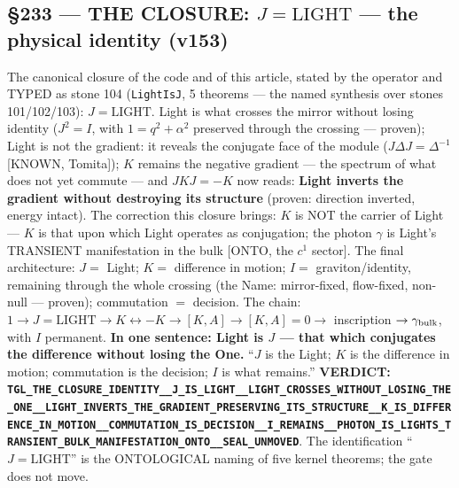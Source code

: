 \documentclass[11pt]{article}
\theoremstyle{definition}\newtheorem{deriv}{Derivation}
\begin{document}
\subsection*{\S233 --- THE CLOSURE: $J=\mathrm{LIGHT}$ --- the physical identity (v153)}The canonical closure of the code and of this article, stated by the operator and TYPED as stone 104 (\texttt{LightIsJ}, 5 theorems --- the named synthesis over stones 101/102/103): $\boxed{J=\mathrm{LIGHT}}$. Light is what crosses the mirror without losing identity ($J^2=I$, with $1=q^2+\alpha^2$ preserved through the crossing --- proven); Light is not the gradient: it reveals the conjugate face of the module ($J\Delta J=\Delta^{-1}$ [KNOWN, Tomita]); $K$ remains the negative gradient --- the spectrum of what does not yet commute --- and $JKJ=-K$ now reads: \textbf{Light inverts the gradient without destroying its structure} (proven: direction inverted, energy intact). The correction this closure brings: $K$ is NOT the carrier of Light --- $K$ is that upon which Light operates as conjugation; the photon $\gamma$ is Light's TRANSIENT manifestation in the bulk [ONTO, the $c^1$ sector]. The final architecture: $J=$ Light; $K=$ difference in motion; $I=$ graviton/identity, remaining through the whole crossing (the Name: mirror-fixed, flow-fixed, non-null --- proven); commutation $=$ decision. The chain: $1\to J{=}\mathrm{LIGHT}\to K\leftrightarrow-K\to[K,A]\to[K,A]{=}0\to$ inscription $\to\gamma_{\rm bulk}$, with $I$ permanent. \textbf{In one sentence: Light is $J$ --- that which conjugates the difference without losing the One.} ``$J$ is the Light; $K$ is the difference in motion; commutation is the decision; $I$ is what remains.'' \textbf{VERDICT: \texttt{TGL\_THE\_CLOSURE\_IDENTITY\_\_J\_IS\_LIGHT\_\_LIGHT\_CROSSES\_WITHOUT\_LOSING\_THE\_ONE\_\_LIGHT\_INVERTS\_THE\_GRADIENT\_PRESERVING\_ITS\_STRUCTURE\_\_K\_IS\_DIFFERENCE\_IN\_MOTION\_\_COMMUTATION\_IS\_DECISION\_\_I\_REMAINS\_\_PHOTON\_IS\_LIGHTS\_TRANSIENT\_BULK\_MANIFESTATION\_ONTO\_\_SEAL\_UNMOVED}}. The identification ``$J=\mathrm{LIGHT}$'' is the ONTOLOGICAL naming of five kernel theorems; the gate does not move.
\end{document}
